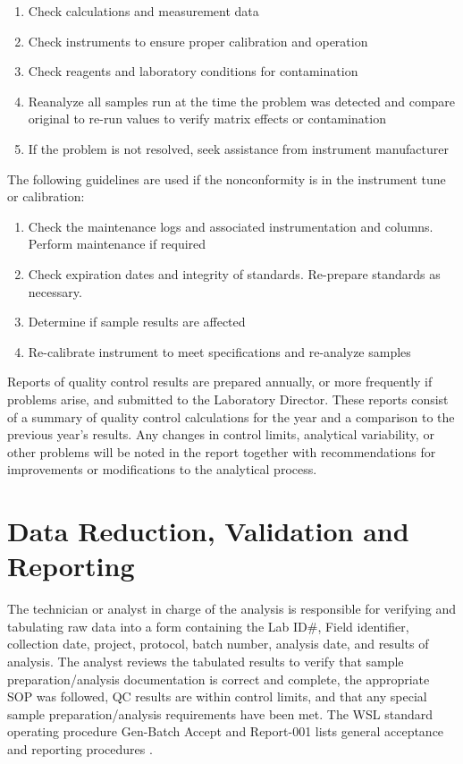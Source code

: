 \begin{enumerate}
\setcounter{enumi}{\thenumberedCntB}
	\item Check calculations and measurement data
	\item Check instruments to ensure proper calibration and operation
	\item Check reagents and laboratory conditions for contamination
	\item Reanalyze all samples run at the time the problem was detected and compare original to re-run values to verify matrix effects or contamination
	\item If the problem is not resolved, seek assistance from instrument manufacturer
\setcounter{numberedCntB}{\theenumi}
\end{enumerate}

\noindent
The following guidelines are used if the nonconformity is in the 
instrument tune or calibration:

\begin{enumerate}
	\item Check the maintenance logs and associated instrumentation and columns. Perform maintenance if required
	\item Check expiration dates and integrity of standards. Re-prepare standards as necessary.
	\item Determine if sample results are affected
	\item Re-calibrate instrument to meet specifications and re-analyze samples
	\setcounter{numberedCntD}{\theenumi}
\end{enumerate}
 

Reports of quality control results are prepared annually, or more 
frequently if problems arise, and submitted to the Laboratory Director. 
These reports consist of a summary of quality control calculations for 
the year and a comparison to the previous year's results. Any changes in 
control limits, analytical variability, or other problems will be noted 
in the report together with recommendations for improvements or 
modifications to the analytical process. 



\section{Data Reduction, Validation and Reporting}
The technician or analyst in charge of the analysis is 
responsible for verifying and tabulating raw data into a form containing 
the Lab ID\#, Field identifier, collection date, project, protocol, 
batch number, analysis date, and results of analysis. The analyst 
reviews the tabulated results to verify that sample preparation/analysis 
documentation is correct and complete, the appropriate SOP was followed, 
QC results are within control limits, and that any special sample 
preparation/analysis requirements have been met. The WSL standard 
operating procedure Gen-Batch Accept and Report-001 lists general 
acceptance and reporting procedures .

